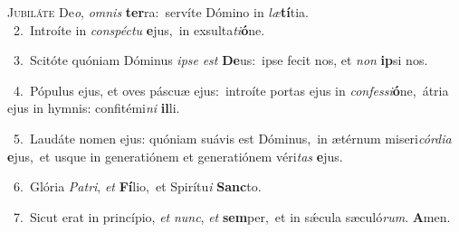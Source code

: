 \lettrine{\initial\textcolor{\initialcolor}{J}}{ubiláte} De\-\textit{o}\-, \textit{om}\-\textit{nis} \textbf{ter}\-ra:~\star servíte Dómino in \textit{læ}\-\textbf{tí}tia.\\
{\numbfont\textcolor{\numbcolor}{~2.}}~Introíte in \textit{con}\-\textit{spéc}\textit{tu} \textbf{e}\-jus,~\star in exsulta\-\textit{ti}\-\textbf{ó}ne.\par
{\numbfont\textcolor{\numbcolor}{~3.}}~Scitóte quóniam Dóminus \textit{ip}\-\textit{se} \textit{est} \textbf{De}\-us:~\star ipse fecit nos, et \textit{non} \textbf{ip}\-si nos.\par
{\numbfont\textcolor{\numbcolor}{~4.}}~Pópulus ejus, et oves páscuæ ejus:~\dagger introíte portas ejus in \textit{con}\-\textit{fes}\textit{si}\textbf{ó}ne,~\star átria ejus in hymnis: confitémi\textit{ni} \textbf{il}\-li.\par
{\numbfont\textcolor{\numbcolor}{~5.}}~Laudáte nomen ejus: quóniam suávis est Dóminus,~\dagger in ætérnum miseri\-\textit{cór}\-\textit{di}\textit{a} \textbf{e}\-jus,~\star et usque in generatiónem et generatiónem véri\textit{tas} \textbf{e}\-jus.\par
{\numbfont\textcolor{\numbcolor}{~6.}}~Glória \textit{Pa}\-\textit{tri}, \textit{et} \textbf{Fí}\-lio,~\star et Spirítu\textit{i} \textbf{Sanc}\-to.\par
{\numbfont\textcolor{\numbcolor}{~7.}}~Sicut erat in princípio, \textit{et} \textit{nunc}\-, \textit{et} \textbf{sem}\-per,~\star et in sǽcula sæculó\-\textit{rum}\-. \textbf{A}\-men.\par
